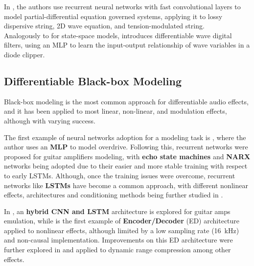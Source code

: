 In \citep{parker2022physical}, the authors use recurrent neural networks with fast convolutional layers to model partial-differential equation governed systems, applying it to lossy dispersive string, 2D wave equation, and tension-modulated string.\\
Analogously to \citep{parker2019modelling} for state-space models, \citep{chowdhury2022emulating} introduces differentiable wave digital filters, using an MLP to learn the input-output relationship of wave variables in a diode clipper.

\subsection{Differentiable Black-box Modeling}
\label{sec:back-diff-black-box}

Black-box modeling is the most common approach for differentiable audio effects, and it has been applied to most linear, non-linear, and modulation effects, although with varying success.

The first example of neural networks adoption for a modeling task is \citep{mendoza2005emulating}, where the author uses an \textbf{MLP} to model overdrive.
Following this, recurrent networks were proposed for guitar amplifiers modeling, with \textbf{echo state machines} \citep{holzmann2009reservoir} and \textbf{NARX} networks \citep{covert2013vacuum} being adopted due to their easier and more stable training with respect to early LSTMs.
Although, once the training issues were overcome, recurrent networks like \textbf{LSTMs} \citep{zhang2018vacuum, schmitz2018nonlinear} have become a common approach, with different nonlinear effects, architectures and conditioning methods being further studied in 
\citep{wright2019real, wright2020real, wright2020perceptual, chowdhury2020comparison, simionato2022deep, simionato2024comparative, yeh2024hyper}.

In \citep{schmitz2019objective}, an \textbf{hybrid CNN and LSTM} architecture is explored for guitar amps emulation, while \citep{ramirez2019modeling} is the first example of \textbf{Encoder/Decoder} (ED) architecture applied to nonlinear effects, although limited by a low sampling rate (16~kHz) and non-causal implementation.
Improvements on this ED architecture were further explored in \citep{ramirez2019general, martinez2020deep} and applied to dynamic range compression among other effects.

